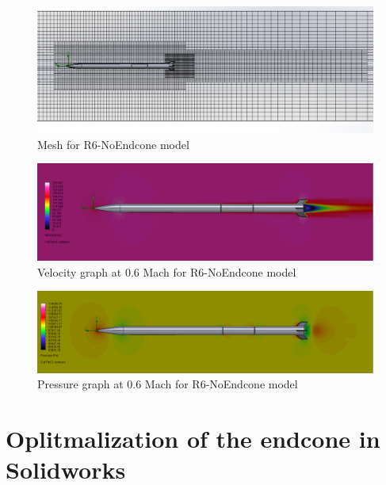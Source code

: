 \documentclass{article}
\begin{document}
\begin{figure}[H]
    \centering
    \includegraphics[width=\textwidth]{../data/R6-NoEndcone-Solid/mesh.png}
    \caption{Mesh for R6-NoEndcone model}
\end{figure}
\begin{figure}[H]
    \centering
    \includegraphics[width=\textwidth]{../data/R6-NoEndcone-Solid/speed.png}
    \caption{Velocity graph at 0.6 Mach for R6-NoEndcone    model}
\end{figure}

\begin{figure}[H]
    \centering
    \includegraphics[width=\textwidth]{../data/R6-NoEndcone-Solid/konospeedoatode.png}
    \caption{Pressure graph at 0.6 Mach for R6-NoEndcone model}
\end{figure}



\section{Oplitmalization of the endcone in Solidworks}
\end{document}
